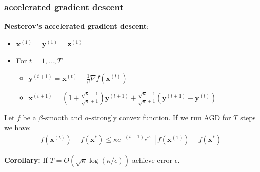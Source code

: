 \documentclass[compress]{beamer}
\newcommand{\bv}[1]{\mathbf{#1}}
\newcommand{\R}{\mathbb{R}}
\begin{document}
\begin{frame}
	\frametitle{accelerated gradient descent}
	\textbf{Nesterov's accelerated gradient descent}:
	\begin{itemize}
		\item $\bv{x}^{(1)} = \bv{y}^{(1)} = \bv{z}^{(1)}$  
		\item For $t = 1,\ldots, T$
		\begin{itemize}
			\item $\bv{y}^{(t+1)} = \bv{x}^{(t)} - \frac{1}{\beta}\nabla f(\bv{x}^{(t)})$
			\item $\bv{x}^{(t+1)} = \left(1 + \frac{\sqrt{\kappa} - 1}{\sqrt{\kappa} + 1}\right) \bv{y}^{(t+1)} + \frac{\sqrt{\kappa} - 1}{\sqrt{\kappa} + 1}\left(\bv{y}^{(t+1)} - \bv{y}^{(t)}\right)$
		\end{itemize}
	\end{itemize}
	\begin{theorem}
		Let $f$ be a $\beta$-smooth and $\alpha$-strongly convex function. If we run AGD for $T$ steps we have:
		\begin{align*}
			f(\bv{x}^{(t)}) - f(\bv{x}^*) \leq \kappa e^{-(t-1)\sqrt{\kappa}} \left[f(\bv{x}^{(1)}) - f(\bv{x}^*) \right]
		\end{align*} 
	\end{theorem}	
	\textbf{Corollary:} If \alert{$T = O\left(\sqrt{\kappa}\log(\kappa/\epsilon)\right)$ achieve error $\epsilon$.} 
	
\end{frame}
%
%		
%		
%		
%
\end{document}
